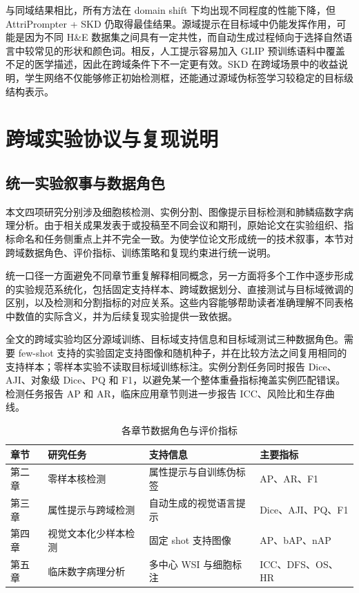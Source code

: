与同域结果相比，所有方法在 domain shift 下均出现不同程度的性能下降，但 AttriPrompter + SKD 仍取得最佳结果。源域提示在目标域中仍能发挥作用，可能是因为不同 H\&E 数据集之间具有一定共性，而自动生成过程倾向于选择自然语言中较常见的形状和颜色词。相反，人工提示容易加入 GLIP 预训练语料中覆盖不足的医学描述，因此在跨域条件下不一定更有效。SKD 在跨域场景中的收益说明，学生网络不仅能够修正初始检测框，还能通过源域伪标签学习较稳定的目标级结构表示。


\section{跨域实验协议与复现说明}
\subsection{统一实验叙事与数据角色}
本文四项研究分别涉及细胞核检测、实例分割、图像提示目标检测和肺鳞癌数字病理分析。由于相关成果发表于或投稿至不同会议和期刊，原始论文在实验组织、指标命名和任务侧重点上并不完全一致。为使学位论文形成统一的技术叙事，本节对跨域数据角色、评价指标、训练策略和复现约束进行统一说明。

统一口径一方面避免不同章节重复解释相同概念，另一方面将多个工作中逐步形成的实验规范系统化，包括固定支持样本、跨域数据划分、直接测试与目标域微调的区别，以及检测和分割指标的对应关系。这些内容能够帮助读者准确理解不同表格中数值的实际含义，并为后续复现实验提供一致依据。


全文的跨域实验均区分源域训练、目标域支持信息和目标域测试三种数据角色。需要 few-shot 支持的实验固定支持图像和随机种子，并在比较方法之间复用相同的支持样本；零样本实验不读取目标域训练标注。实例分割任务同时报告 Dice、AJI、对象级 Dice、PQ 和 F1，以避免某一个整体重叠指标掩盖实例匹配错误。检测任务报告 AP 和 AR，临床应用章节则进一步报告 ICC、风险比和生存曲线。

\begin{table}[htbp]
  \centering
  \caption{各章节数据角色与评价指标}
  \label{tab:crosschapter_protocol}
  \small
  \begin{tabular}{llll}
    \toprule
    章节 & 研究任务 & 支持信息 & 主要指标 \\
    \midrule
    第二章 & 零样本核检测 & 属性提示与自训练伪标签 & AP、AR、F1 \\
    第三章 & 属性提示与跨域检测 & 自动生成的视觉语言提示 & Dice、AJI、PQ、F1 \\
    第四章 & 视觉文本化少样本检测 & 固定 shot 支持图像 & AP、bAP、nAP \\
    第五章 & 临床数字病理分析 & 多中心 WSI 与细胞标注 & ICC、DFS、OS、HR \\
    \bottomrule
  \end{tabular}
\end{table}

